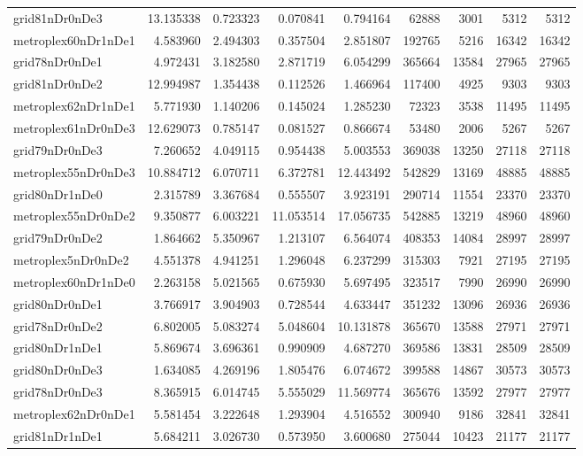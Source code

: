 \begin{longtable}{|l|r|r|r|r|r|r|r|r|}
grid81nDr0nDe3 & 13.135338 & 0.723323 & 0.070841 & 0.794164 & 62888 & 3001 & 5312 & 5312 \\
metroplex60nDr1nDe1 & 4.583960 & 2.494303 & 0.357504 & 2.851807 & 192765 & 5216 & 16342 & 16342 \\
grid78nDr0nDe1 & 4.972431 & 3.182580 & 2.871719 & 6.054299 & 365664 & 13584 & 27965 & 27965 \\
grid81nDr0nDe2 & 12.994987 & 1.354438 & 0.112526 & 1.466964 & 117400 & 4925 & 9303 & 9303 \\
metroplex62nDr1nDe1 & 5.771930 & 1.140206 & 0.145024 & 1.285230 & 72323 & 3538 & 11495 & 11495 \\
metroplex61nDr0nDe3 & 12.629073 & 0.785147 & 0.081527 & 0.866674 & 53480 & 2006 & 5267 & 5267 \\
grid79nDr0nDe3 & 7.260652 & 4.049115 & 0.954438 & 5.003553 & 369038 & 13250 & 27118 & 27118 \\
metroplex55nDr0nDe3 & 10.884712 & 6.070711 & 6.372781 & 12.443492 & 542829 & 13169 & 48885 & 48885 \\
grid80nDr1nDe0 & 2.315789 & 3.367684 & 0.555507 & 3.923191 & 290714 & 11554 & 23370 & 23370 \\
metroplex55nDr0nDe2 & 9.350877 & 6.003221 & 11.053514 & 17.056735 & 542885 & 13219 & 48960 & 48960 \\
grid79nDr0nDe2 & 1.864662 & 5.350967 & 1.213107 & 6.564074 & 408353 & 14084 & 28997 & 28997 \\
metroplex5nDr0nDe2 & 4.551378 & 4.941251 & 1.296048 & 6.237299 & 315303 & 7921 & 27195 & 27195 \\
metroplex60nDr1nDe0 & 2.263158 & 5.021565 & 0.675930 & 5.697495 & 323517 & 7990 & 26990 & 26990 \\
grid80nDr0nDe1 & 3.766917 & 3.904903 & 0.728544 & 4.633447 & 351232 & 13096 & 26936 & 26936 \\
grid78nDr0nDe2 & 6.802005 & 5.083274 & 5.048604 & 10.131878 & 365670 & 13588 & 27971 & 27971 \\
grid80nDr1nDe1 & 5.869674 & 3.696361 & 0.990909 & 4.687270 & 369586 & 13831 & 28509 & 28509 \\
grid80nDr0nDe3 & 1.634085 & 4.269196 & 1.805476 & 6.074672 & 399588 & 14867 & 30573 & 30573 \\
grid78nDr0nDe3 & 8.365915 & 6.014745 & 5.555029 & 11.569774 & 365676 & 13592 & 27977 & 27977 \\
metroplex62nDr0nDe1 & 5.581454 & 3.222648 & 1.293904 & 4.516552 & 300940 & 9186 & 32841 & 32841 \\
grid81nDr1nDe1 & 5.684211 & 3.026730 & 0.573950 & 3.600680 & 275044 & 10423 & 21177 & 21177 \\

\end{longtable}
